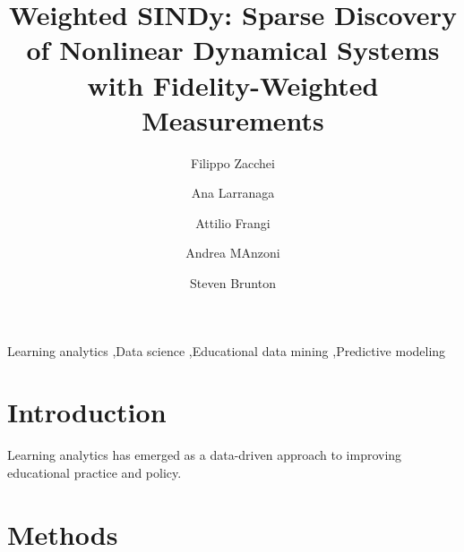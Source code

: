 \documentclass[final,3p,10.5pt]{elsarticle}
\begin{document}
\begin{frontmatter}

\title{Weighted SINDy: Sparse Discovery of Nonlinear Dynamical Systems with Fidelity-Weighted Measurements}

\author[aff1]{Filippo Zacchei}

\author[aff2]{Ana Larranaga}

\author[aff3]{Attilio Frangi}

\author[aff1]{Andrea MAnzoni}

\author[aff4]{Steven Brunton}

\address[aff1]{Politecnico di Milano, MOX - Dept. of Mathematics, p.za Leonardo da Vinci, 32, Milano, 20133, Italy}
\address[aff2]{AI Institute in Dynamic Systems, University of Washington, Seattle, USA}
\address[aff3]{Politecnico di Milano, Dept. of Civil and Environmental Engineering, p.za Leonardo da Vinci, 32, Milano, 20133, Italy}
\address[aff4]{Department of Mechanical Engineering, University of Washington, Seattle, Washington 98195, USA}



\begin{keyword}
Learning analytics \sep Data science \sep Educational data mining \sep Predictive modeling
\end{keyword}

\end{frontmatter}

\section{Introduction}

Learning analytics has emerged as a data-driven approach to improving educational practice and policy.

\section{Methods}
\end{document}
